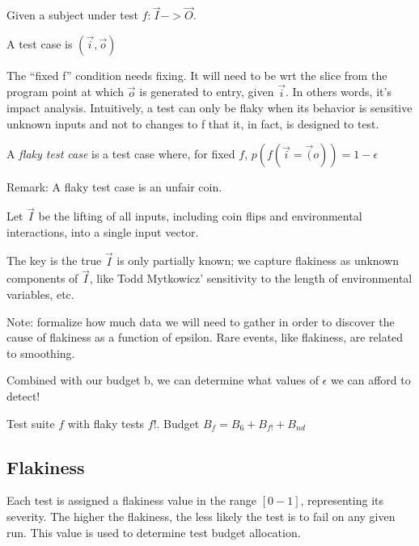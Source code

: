 \begin{defn}
	Given a subject under test $f: \vec{I} -> \vec{O}$.

	A test case is $(\vec{i},\vec{o})$

	The “fixed f” condition needs fixing. It will need to be wrt the slice from the program point at which $\vec{o}$ is generated to entry, given $\vec{i}$. In others words, it’s impact analysis. Intuitively, a test can only be flaky when its behavior is sensitive unknown inputs and not to changes to f that it, in fact, is designed to test.

	A \emph{flaky test case} is a test case where, for fixed $f$,
	$p(f(\vec{i} = \vec(o)) = 1 - \epsilon$

	Remark: A flaky test case is an unfair coin.

	Let $\vec{I}$ be the lifting of all inputs, including coin flips and environmental interactions, into a single input vector.

	The key is the true $\vec{I}$ is only partially known;  we capture flakiness as unknown components of $\vec{I}$, like Todd Mytkowicz’ sensitivity to the length of environmental variables, etc.

	Note: formalize how much data we will need to gather in order to discover the cause of flakiness as a function of epsilon. Rare events, like flakiness, are related to smoothing.

	Combined with our budget b, we can determine what values of $\epsilon$ we can afford to detect!
\end{defn}

Test suite $f$ with flaky tests $f!$.
Budget $B_{f} = B_{6} + B_{f!} + B_{nd}$

\subsection{Flakiness}

Each test is assigned a flakiness value in the range $[0-1]$, representing its severity. The higher the flakiness, the less likely the test is to fail on any given run. This value is used to determine test budget allocation.

